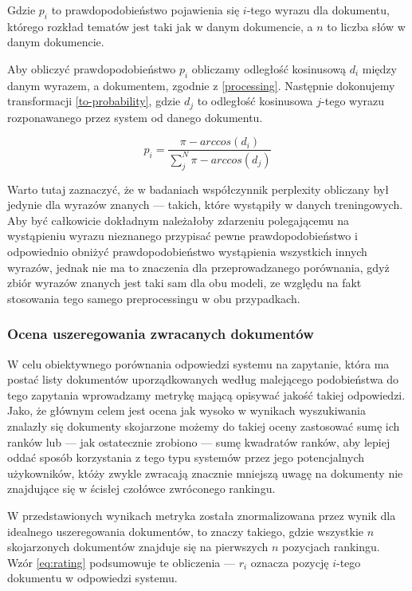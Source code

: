 \documentclass[11pt,a4paper]{article}
\begin{document}
Gdzie $p_i$ to prawdopodobieństwo pojawienia się $i$-tego wyrazu dla dokumentu,
którego rozkład tematów jest taki jak w danym dokumencie, a $n$ to liczba słów
w danym dokumencie.

Aby obliczyć prawdopodobieństwo $p_i$ obliczamy odległość kosinusową $d_i$
między danym wyrazem, a dokumentem, zgodnie z \ref{processing}. Następnie
dokonujemy transformacji \ref{to-probability}, gdzie $d_j$ to odległość
kosinusowa $j$-tego wyrazu rozponawanego przez system od danego dokumentu.

\begin{equation}
  \label{to-probability}
  p_i = \frac{\pi - arccos(d_i)}{\sum_j^N \pi - arccos(d_j)}
\end{equation}

Warto tutaj zaznaczyć, że w badaniach współczynnik perplexity obliczany był
jedynie dla wyrazów znanych --- takich, które wystąpiły w danych treningowych.
Aby być całkowicie dokładnym należałoby zdarzeniu polegającemu na wystąpieniu
wyrazu nieznanego przypisać pewne prawdopodobieństwo i odpowiednio obniżyć
prawdopodobieństwo wystąpienia wszystkich innych wyrazów, jednak nie ma to
znaczenia dla przeprowadzanego porównania, gdyż zbiór wyrazów znanych jest taki
sam dla obu modeli, ze względu na fakt stosowania tego samego preprocessingu w
obu przypadkach.

\subsubsection{Ocena uszeregowania zwracanych dokumentów}
\label{sec:ranking}

W celu obiektywnego porównania odpowiedzi systemu na zapytanie, która ma postać
listy dokumentów uporządkowanych według malejącego podobieństwa do tego
zapytania wprowadzamy metrykę mającą opisywać jakość takiej odpowiedzi. Jako,
że głównym celem jest ocena jak wysoko w wynikach wyszukiwania znalazły się
dokumenty skojarzone możemy do takiej oceny zastosować sumę ich ranków lub ---
jak ostatecznie zrobiono --- sumę kwadratów ranków, aby lepiej oddać sposób
korzystania z tego typu systemów przez jego potencjalnych użykowników, któży
zwykle zwracają znacznie mniejszą uwagę na dokumenty nie znajdujące się w
ścisłej czołówce zwróconego rankingu.

W przedstawionych wynikach metryka została znormalizowana przez wynik dla
idealnego uszeregowania dokumentów, to znaczy takiego, gdzie wszystkie $n$
skojarzonych dokumentów znajduje się na pierwszych $n$ pozycjach rankingu. Wzór
\ref{eq:rating} podsumowuje te obliczenia --- $r_i$ oznacza pozycję $i$-tego
dokumentu w odpowiedzi systemu.
\end{document}
